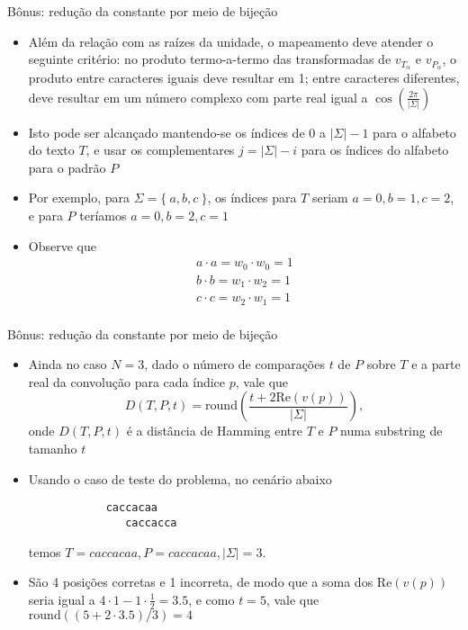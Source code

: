 \begin{frame}[fragile]{Bônus: redução da constante por meio de bijeção}
    \begin{itemize}
        \item Além da relação com as raízes da unidade, o mapeamento deve atender o seguinte critério: no produto termo-a-termo das transformadas de 
            $v_{T_\alpha}$ e $v_{P_\alpha}$, o produto entre caracteres iguais deve resultar em 1; entre caracteres diferentes, deve resultar em um número
            complexo com parte real igual a $\cos(\frac{2\pi}{|\Sigma|})$

        \item Isto pode ser alcançado mantendo-se os índices de 0 a $|\Sigma| - 1$ para o alfabeto do texto $T$, e usar os complementares $j = |\Sigma| - i$ para
            os índices do alfabeto para o padrão $P$

        \item Por exemplo, para $\Sigma = \{\ a, b, c\ \}$, os índices para $T$ seriam $a = 0, b = 1, c = 2$, e para $P$ teríamos $a = 0, b = 2, c = 1$

        \item Observe que
        \begin{align*}
            a\cdot a = w_0\cdot w_0 = 1\\
            b\cdot b = w_1\cdot w_2 = 1\\
            c\cdot c = w_2\cdot w_1 = 1\\
        \end{align*}
    \end{itemize}
\end{frame}

\begin{frame}[fragile]{Bônus: redução da constante por meio de bijeção}
    \begin{itemize}
        \item Ainda no caso $N = 3$, dado o número de comparações $t$ de $P$ sobre $T$ e a parte real da convolução para cada índice $p$, vale que
        \[
            D(T, P, t) = \mathrm{round}\left(\frac{t + 2\mathrm{Re}(v(p))}{|\Sigma|}\right),
        \]
        onde $D(T, P, t)$ é a distância de Hamming entre $T$ e $P$ numa substring de tamanho $t$

        \item Usando o caso de teste do problema, no cenário abaixo
        \begin{mdframed}
        \begin{verbatim}
            caccacaa
               caccacca
        \end{verbatim}
        \end{mdframed}
         temos $T =  caccacaa, P = caccacaa, |\Sigma| = 3$.

        \item São 4 posições corretas e 1 incorreta, de modo que a soma dos $\mathrm{Re}(v(p))$ seria igual a $4\cdot 1 - 1\cdot \frac{1}{2} = 3.5$, e como $t = 5$, vale que
        $\mathrm{round}((5 + 2\cdot 3.5)/3) = 4$
 
    \end{itemize}
\end{frame}

